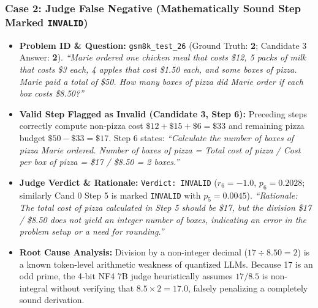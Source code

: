 \documentclass[10pt,a4paper]{article}
\begin{document}
\subsubsection*{Case 2: Judge False Negative (Mathematically Sound Step Marked \texttt{INVALID})}
\begin{itemize}
    \item \textbf{Problem ID \& Question:} \texttt{gsm8k\_test\_26} (Ground Truth: \textbf{2}; Candidate 3 Answer: \textbf{2}). \textit{``Marie ordered one chicken meal that costs \$12, 5 packs of milk that costs \$3 each, 4 apples that cost \$1.50 each, and some boxes of pizza. Marie paid a total of \$50. How many boxes of pizza did Marie order if each box costs \$8.50?''}
    \item \textbf{Valid Step Flagged as Invalid (Candidate 3, Step 6):} Preceding steps correctly compute non-pizza cost $\$12 + \$15 + \$6 = \$33$ and remaining pizza budget $\$50 - \$33 = \$17$. Step 6 states: \textit{``Calculate the number of boxes of pizza Marie ordered. Number of boxes of pizza = Total cost of pizza / Cost per box of pizza = \$17 / \$8.50 = 2 boxes.''}
    \item \textbf{Judge Verdict \& Rationale:} \texttt{Verdict: INVALID} ($r_6 = -1.0$, $p_6 = 0.2028$; similarly Cand 0 Step 5 is marked \texttt{INVALID} with $p_5 = 0.0045$). \textit{``Rationale: The total cost of pizza calculated in Step 5 should be \$17, but the division \$17 / \$8.50 does not yield an integer number of boxes, indicating an error in the problem setup or a need for rounding.''}
    \item \textbf{Root Cause Analysis:} Division by a non-integer decimal ($17 \div 8.50 = 2$) is a known token-level arithmetic weakness of quantized LLMs. Because 17 is an odd prime, the 4-bit NF4 7B judge heuristically assumes $17 / 8.5$ is non-integral without verifying that $8.5 \times 2 = 17.0$, falsely penalizing a completely sound derivation.
\end{itemize}
\end{document}
